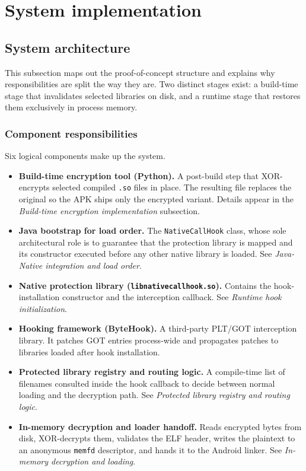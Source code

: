 \documentclass[11pt,a4paper]{report}
\renewcommand\_{{\textunderscore\allowbreak}}
\begin{document}
\newpage

\section{System implementation}

\subsection{System architecture}

This subsection maps out the proof-of-concept structure and explains why responsibilities are split the way they are.  Two distinct stages exist: a build-time stage that invalidates selected libraries on disk, and a runtime stage that restores them exclusively in process memory.

\subsubsection{Component responsibilities}

Six logical components make up the system.

\begin{itemize}
    \item \textbf{Build-time encryption tool (Python).}
    A post-build step that XOR-encrypts selected compiled \texttt{.so} files in place.  The resulting file replaces the original so the APK ships only the encrypted variant.  Details appear in the \textit{Build-time encryption implementation} subsection.

    \item \textbf{Java bootstrap for load order.}
    The \texttt{NativeCallHook} class, whose sole architectural role is to guarantee that the protection library is mapped and its constructor executed before any other native library is loaded.  See \textit{Java-Native integration and load order}.

    \item \textbf{Native protection library (\texttt{libnativecallhook.so}).}
    Contains the hook-installation constructor and the interception callback.  See \textit{Runtime hook initialization}.

    \item \textbf{Hooking framework (ByteHook).}
    A third-party PLT/GOT interception library.  It patches GOT entries process-wide and propagates patches to libraries loaded after hook installation.

    \item \textbf{Protected library registry and routing logic.}
    A compile-time list of filenames consulted inside the hook callback to decide between normal loading and the decryption path.  See \textit{Protected library registry and routing logic}.

    \item \textbf{In-memory decryption and loader handoff.}
    Reads encrypted bytes from disk, XOR-decrypts them, validates the ELF header, writes the plaintext to an anonymous \texttt{memfd} descriptor, and hands it to the Android linker.  See \textit{In-memory decryption and loading}.
\end{itemize}
\end{document}

